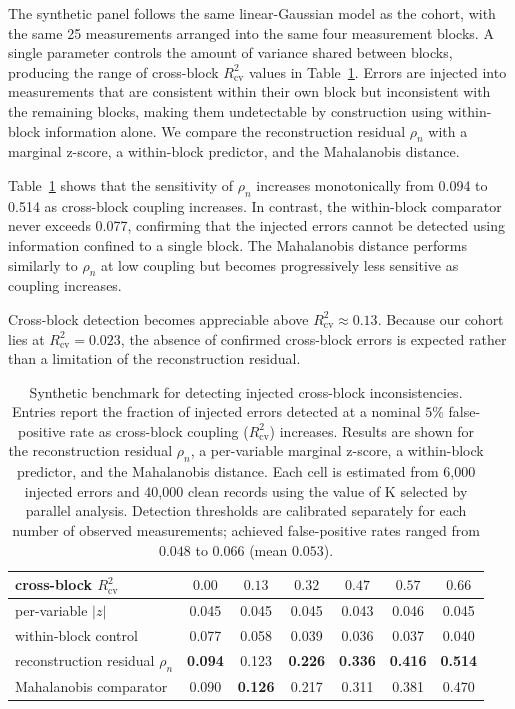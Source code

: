 \documentclass[a4paper,fleqn]{cas-sc}
\begin{document}
The synthetic panel follows the same linear-Gaussian model as the cohort, with the same 25 measurements arranged into the same four measurement blocks. A single parameter controls the amount of variance shared between blocks, producing the range of cross-block $R^2_{\mathrm{cv}}$ values in Table~\ref{tab:synth}. Errors are injected into measurements that are consistent within their own block but inconsistent with the remaining blocks, making them undetectable by construction using within-block information alone. We compare the reconstruction residual $\rho_n$ with a marginal z-score, a within-block predictor, and the Mahalanobis distance.

Table~\ref{tab:synth} shows that the sensitivity of $\rho_n$ increases monotonically from 0.094 to 0.514 as cross-block coupling increases. In contrast, the within-block comparator never exceeds 0.077, confirming that the injected errors cannot be detected using information confined to a single block. The Mahalanobis distance performs similarly to $\rho_n$ at low coupling but becomes progressively less sensitive as coupling increases.

Cross-block detection becomes appreciable above $R^2_{\mathrm{cv}}\approx0.13$. Because our cohort lies at $R^2_{\mathrm{cv}}=0.023$, the absence of confirmed cross-block errors is expected rather than a limitation of the reconstruction residual.

\begin{table}[width=\linewidth,cols=7,pos=h] \centering

\small \begin{tabular}{lcccccc} \toprule cross-block $R^2_{\mathrm{cv}}$ & $0.00$ & $0.13$ & $0.32$ & $0.47$ & $0.57$ & $0.66$ \\ \midrule per-variable $|z|$ & 0.045 & 0.045 & 0.045 & 0.043 & 0.046 & 0.045 \\ within-block control & 0.077 & 0.058 & 0.039 & 0.036 & 0.037 & 0.040 \\ reconstruction residual $\rho_n$ & \textbf{0.094} & 0.123 & \textbf{0.226} & \textbf{0.336} & \textbf{0.416} & \textbf{0.514} \\ Mahalanobis comparator & 0.090 & \textbf{0.126} & 0.217 & 0.311 & 0.381 & 0.470 \\ \bottomrule \end{tabular} 
\caption{Synthetic benchmark for detecting injected cross-block inconsistencies. Entries report the fraction of injected errors detected at a nominal $5\%$ false-positive rate as cross-block coupling ($R^2_{\mathrm{cv}}$) increases. Results are shown for the reconstruction residual $\rho_n$, a per-variable marginal z-score, a within-block predictor, and the Mahalanobis distance. Each cell is estimated from 6,000 injected errors and 40,000 clean records using the value of K selected by parallel analysis. Detection thresholds are calibrated separately for each number of observed measurements; achieved false-positive rates ranged from $0.048$ to $0.066$ (mean $0.053$).  }
\label{tab:synth} 
\end{table}
\end{document}
